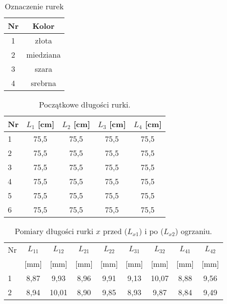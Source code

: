 \documentclass[a4paper,12pt]{article}
\begin{document}
\begin{table}[H]
    \centering
    \begin{tabular}{|c|c|}
        \hline
        \textbf{Nr} & \textbf{Kolor} \\
        \hline
        1 & złota \\
        \hline
        2 & miedziana \\
        \hline
        3 & szara \\
        \hline
        4 & srebrna \\
        \hline
    \end{tabular}
    \caption{Oznaczenie rurek}
\end{table}

\begin{table}[H]
    \centering
    \begin{tabular}{|l|c|c|c|c|}
        \hline
        Nr & $L_1$ [cm] & $L_2$ [cm] & $L_3$ [cm] & $L_4$ [cm] \\
        \hline
        1 & 75,5 & 75,5 & 75,5 & 75,5 \\
        2 & 75,5 & 75,5 & 75,5 & 75,5 \\
        3 & 75,5 & 75,5 & 75,5 & 75,5 \\
        4 & 75,5 & 75,5 & 75,5 & 75,5 \\
        5 & 75,5 & 75,5 & 75,5 & 75,5 \\
        6 & 75,5 & 75,5 & 75,5 & 75,5 \\
        \hline
    \end{tabular}
    \caption{Początkowe długości rurki.}
\end{table}

\begin{table}[H]
    \centering
    \begin{tabular}{|l|c|c||c|c||c|c||c|c|}
        \hline
        Nr & $L_{11}$ & $L_{12}$ & $L_{21}$ & $L_{22}$ & $L_{31}$ & $L_{32}$ & $L_{41}$ & $L_{42}$ \\
        & [mm] & [mm] & [mm] & [mm] & [mm] & [mm] & [mm] & [mm] \\
        \hline
        1 & 8,87 & 9,93 & 8,96 & 9,91 & 9,13 & 10,07 & 8,88 & 9,56 \\
        2 & 8,94 & 10,01 & 8,90 & 9,85 & 8,93 & 9,87 & 8,84 & 9,49 \\
        \hline
    \end{tabular}
    \caption{Pomiary długości rurki $x$ przed ($L_{x1}$) i po ($L_{x2}$) ogrzaniu.}
\end{table}
\end{document}
